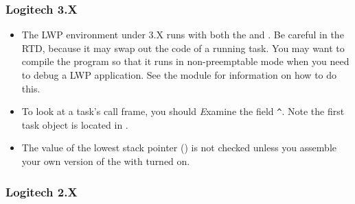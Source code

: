 \subsubsection{Logitech 3.X}
\begin{itemize}
\item
    The LWP environment under 3.X runs with both the  and 
    .  Be careful in the RTD, because it may
    swap out the code of a running task.  You may want to compile
    the program so that it runs in non-preemptable mode when
    you need to debug a LWP application.  See the module 
     for information on how to do this.
\item
    To look at a task's call frame, you should {\em E}xamine the 
    field \verb*!^!.  
    Note the
    first task object is located in .
\item
    The value of the lowest stack pointer ()
    is not checked unless you assemble your own version of the
     with  turned on.
\end{itemize}

\subsubsection{Logitech 2.X}
    
